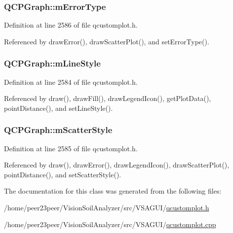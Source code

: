 \subsubsection[{m\+Error\+Type}]{ Q\+C\+P\+Graph\+::m\+Error\+Type\hspace{0.3cm}{\ttfamily [protected]}}\label{class_q_c_p_graph_a29e64273db201aeadebc61c870720a36}


Definition at line 2586 of file qcustomplot.\+h.



Referenced by draw\+Error(), draw\+Scatter\+Plot(), and set\+Error\+Type().

\hypertarget{class_q_c_p_graph_a8604fd98402035a63375849f7341ee25}{}
\subsubsection[{m\+Line\+Style}]{ Q\+C\+P\+Graph\+::m\+Line\+Style\hspace{0.3cm}{\ttfamily [protected]}}\label{class_q_c_p_graph_a8604fd98402035a63375849f7341ee25}


Definition at line 2584 of file qcustomplot.\+h.



Referenced by draw(), draw\+Fill(), draw\+Legend\+Icon(), get\+Plot\+Data(), point\+Distance(), and set\+Line\+Style().

\hypertarget{class_q_c_p_graph_a4aa36241f166ccd1f75fc8f24e4a3247}{}
\subsubsection[{m\+Scatter\+Style}]{ Q\+C\+P\+Graph\+::m\+Scatter\+Style\hspace{0.3cm}{\ttfamily [protected]}}\label{class_q_c_p_graph_a4aa36241f166ccd1f75fc8f24e4a3247}


Definition at line 2585 of file qcustomplot.\+h.



Referenced by draw(), draw\+Error(), draw\+Legend\+Icon(), draw\+Scatter\+Plot(), point\+Distance(), and set\+Scatter\+Style().



The documentation for this class was generated from the following files\+:\begin{DoxyCompactItemize}
\item 
/home/peer23peer/\+Vision\+Soil\+Analyzer/src/\+V\+S\+A\+G\+U\+I/\hyperlink{qcustomplot_8h}{qcustomplot.\+h}\item 
/home/peer23peer/\+Vision\+Soil\+Analyzer/src/\+V\+S\+A\+G\+U\+I/\hyperlink{qcustomplot_8cpp}{qcustomplot.\+cpp}\end{DoxyCompactItemize}
